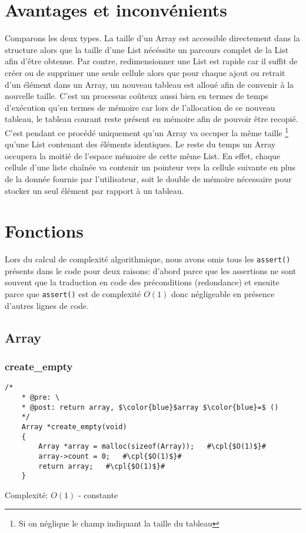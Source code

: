 \documentclass[a4paper, 11pt, oneside]{article}
\begin{document}
\section{Avantages et inconvénients}
	Comparons les deux types. La taille d'un Array est accessible directement dans la structure alors que la taille d'une List nécéssite un parcours complet de la List afin d'être obtenue. Par contre, redimensionner une List est rapide car il suffit de créer ou de supprimer une seule cellule alors que pour chaque ajout ou retrait d'un élément dans un Array, un nouveau tableau est alloué afin de convenir à la nouvelle taille. C'est un processus coûteux aussi bien en termes de temps d'exécution qu'en termes de mémoire car lors de l'allocation de ce nouveau tableau, le tableau courant reste présent en mémoire afin de pouvoir être recopié. C'est pendant ce procédé uniquement qu'un Array va occuper la même taille \footnote{Si on néglique le champ indiquant la taille du tableau} qu'une List contenant des éléments identiques. Le reste du temps un Array occupera la moitié de l'espace mémoire de cette même List. En effet, chaque cellule d'une liste chaînée va contenir un pointeur vers la cellule suivante en plus de la donnée fournie par l'utilisateur, soit le double de mémoire nécessaire pour stocker un seul élément par rapport à un tableau.
	
	\clearpage
\section {Fonctions}
	Lors du calcul de complexité algorithmique, nous avons omis tous les \texttt{assert()} présents dans le code pour deux raisons: d'abord parce que les assertions ne sont souvent que la traduction en code des préconditions (redondance) et ensuite parce que \texttt{assert()} est de complexité $O(1)$ donc négligeable en présence d'autres lignes de code. 
	
	\subsection{Array}
	\subsubsection{create\_empty}
	\begin{lstlisting}[mathescape]
	/*
	* @pre: \
	* @post: return array, $\color{blue}$array $\color{blue}=$ ()
	*/
	Array *create_empty(void) 
	{
		Array *array = malloc(sizeof(Array));	#\cpl{$O(1)$}#
		array->count = 0;	#\cpl{$O(1)$}#
		return array;	#\cpl{$O(1)$}#
	}
	\end{lstlisting}
	Complexité: $O(1)$ - constante
	
\end{document}
